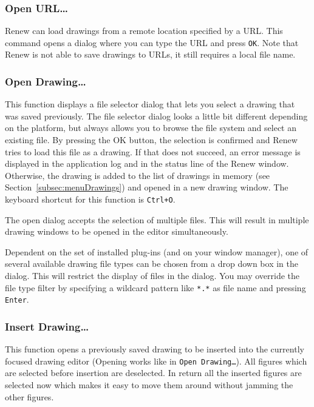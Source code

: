 \subsubsection{Open URL\dots}

Renew can load drawings from a remote location
specified by a URL.
This command opens a dialog where you can type the URL and
press \texttt{OK}.
Note that Renew is not able to save drawings to URLs, it
still requires a local file name.

\subsubsection{Open Drawing\dots}

This function displays a file selector dialog that lets you select
a drawing that was saved previously.
The file selector dialog looks a little bit different depending
on the platform, but always allows you to browse the file system and
select an existing file. By pressing the OK button, the selection
is confirmed and Renew tries to load this file as a drawing.
If that does not succeed, an error message is displayed in the
application log and in the status line of the Renew window.
Otherwise, the drawing is added to the list of drawings in
memory (see Section~\ref{subsec:menuDrawings}) and opened in a new
drawing window.
The keyboard shortcut for this function is \texttt{Ctrl+O}.

The open dialog accepts the selection of multiple files.
This will result in multiple drawing windows to be opened in
the editor simultaneously.

Dependent on the set of installed plug-ins (and on your window
manager), one of several available drawing file types can be
chosen from a drop down box in the dialog.
This will restrict the display of files in the dialog.
You may override the file type filter by specifying a wildcard
pattern like \texttt{*.*} as file name and pressing
\texttt{Enter}.


\subsubsection{Insert Drawing\dots}
This function opens a previously saved drawing to be inserted into the
currently focused drawing editor (Opening works like in \texttt{Open Drawing\dots{}}).
All figures which are selected before insertion are deselected. In return all
the inserted figures are selected now
which makes it easy to move them around without jamming the other figures.

